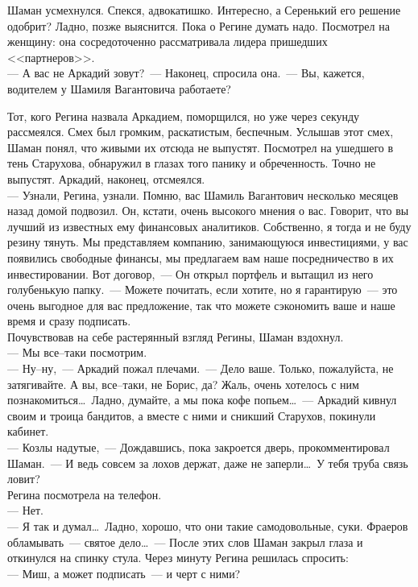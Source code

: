 Шаман усмехнулся. Спекся, адвокатишко. Интересно, а Серенький его решение 
одобрит? Ладно, позже выяснится. Пока о Регине думать надо. Посмотрел на 
женщину: она сосредоточенно рассматривала лидера пришедших <<партнеров>>.\\
--- А вас не Аркадий зовут?~--- Наконец, спросила она.~--- Вы, кажется, водителем 
у Шамиля Вагантовича работаете?

Тот, кого Регина назвала Аркадием, поморщился, но уже через секунду рассмеялся. 
Смех был громким, раскатистым, беспечным. Услышав этот смех, Шаман понял, что 
живыми их отсюда не выпустят. Посмотрел на ушедшего в тень Старухова, обнаружил 
в глазах того панику и обреченность. Точно не выпустят. Аркадий, наконец, 
отсмеялся.\\
--- Узнали, Регина, узнали. Помню, вас Шамиль Вагантович несколько месяцев назад 
домой подвозил. Он, кстати, очень высокого мнения о вас. Говорит, что вы лучший 
из известных ему финансовых аналитиков. Собственно, я тогда и не буду резину 
тянуть. Мы представляем компанию, занимающуюся инвестициями, у вас появились 
свободные финансы, мы предлагаем вам наше посредничество в их инвестировании. 
Вот договор,~--- Он открыл портфель и вытащил из него голубенькую папку.~--- 
Можете почитать, если хотите, но я гарантирую~--- это очень выгодное для вас 
предложение, так что можете сэкономить ваше и наше время и сразу подписать.\\
Почувствовав на себе растерянный взгляд Регины, Шаман вздохнул.\\
--- Мы все--таки посмотрим.\\
--- Ну--ну,~--- Аркадий пожал плечами.~--- Дело ваше. Только, пожалуйста, не 
затягивайте. А вы, все--таки, не Борис, да? Жаль, очень хотелось с ним 
познакомиться\ldots\ Ладно, думайте, а мы пока кофе попьем\ldots~--- Аркадий 
кивнул своим и троица бандитов, а вместе с ними и сникший Старухов, покинули кабинет.\\
--- Козлы надутые,~--- Дождавшись, пока закроется дверь, прокомментировал 
Шаман.~--- И ведь совсем за лохов держат, даже не заперли\ldots\ У тебя труба связь ловит?\\
Регина посмотрела на телефон.\\
--- Нет.\\
--- Я так и думал\ldots\ Ладно, хорошо, что они такие самодовольные, суки. 
Фраеров обламывать~--- святое дело\ldots~--- После этих слов Шаман закрыл глаза и 
откинулся на спинку стула. Через минуту Регина решилась спросить:\\
--- Миш, а может подписать~--- и черт с ними?\\
